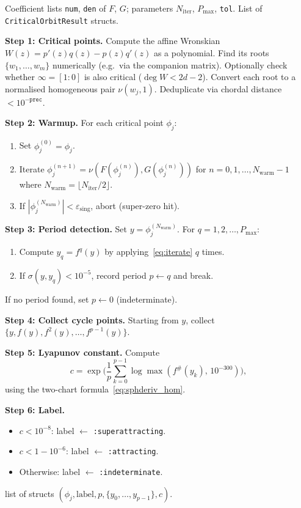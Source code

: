 \documentclass[12pt]{article}
\theoremstyle{definition}
\newcommand{\fsh}{f^{\#}}
\newcommand{\hpair}{[F:G]}
\begin{document}
\begin{algorithm}[h]
\caption{Critical orbit analysis for $f=\hpair$ of degree $d$}
\label{alg:critical}
\begin{algorithmic}[1]
\Require Coefficient lists \texttt{num}, \texttt{den} of $F$, $G$;
         parameters $N_{\mathrm{iter}}$, $P_{\max}$, \texttt{tol}.
\Ensure List of \texttt{CriticalOrbitResult} structs.

\State \textbf{Step 1: Critical points.}
  Compute the affine Wronskian $W(z)=p'(z)q(z)-p(z)q'(z)$ as a
  polynomial.  Find its roots $\{w_1,\ldots,w_m\}$ numerically
  (e.g.\ via the companion matrix).  Optionally check whether
  $\infty=[1:0]$ is also critical ($\deg W<2d-2$).
  Convert each root to a normalised homogeneous pair
  $\nu(w_j,1)$.  Deduplicate via chordal distance $<10^{-\texttt{prec}}$.

\State \textbf{Step 2: Warmup.}
  For each critical point $\phi_j$:
  \begin{enumerate}[label=\alph*.]
    \item Set $\phi_j^{(0)}=\phi_j$.
    \item Iterate $\phi_j^{(n+1)}=\nu(F(\phi_j^{(n)}),G(\phi_j^{(n)}))$
          for $n=0,1,\ldots,N_{\mathrm{warm}}-1$
          where $N_{\mathrm{warm}}=\lfloor N_{\mathrm{iter}}/2\rfloor$.
    \item If $|\phi_j^{(N_{\mathrm{warm}})}|<\varepsilon_{\mathrm{sing}}$,
          abort (super-zero hit).
  \end{enumerate}

\State \textbf{Step 3: Period detection.}
  Set $y=\phi_j^{(N_{\mathrm{warm}})}$.  For $q=1,2,\ldots,P_{\max}$:
  \begin{enumerate}[label=\alph*.]
    \item Compute $y_q = f^q(y)$ by applying~\eqref{eq:iterate} $q$ times.
    \item If $\sigma(y, y_q)<10^{-5}$, record period $p\leftarrow q$ and
          break.
  \end{enumerate}
  If no period found, set $p\leftarrow 0$ (indeterminate).

\State \textbf{Step 4: Collect cycle points.}
  Starting from $y$, collect $\{y, f(y), f^2(y), \ldots, f^{p-1}(y)\}$.

\State \textbf{Step 5: Lyapunov constant.}
  Compute
  \[
    c = \exp\!\biggl(\frac{1}{p}\sum_{k=0}^{p-1}
                     \log\max(\fsh(y_k),\,10^{-300})\biggr),
  \]
  using the two-chart formula~\eqref{eq:sphderiv_hom}.

\State \textbf{Step 6: Label.}
  \begin{itemize}[noitemsep]
    \item $c<10^{-8}$: label $\leftarrow$ \texttt{:superattracting}.
    \item $c<1-10^{-6}$: label $\leftarrow$ \texttt{:attracting}.
    \item Otherwise: label $\leftarrow$ \texttt{:indeterminate}.
  \end{itemize}

\State \Return list of structs
  $(\phi_j, \mathrm{label}, p, \{y_0,\ldots,y_{p-1}\}, c)$.
\end{algorithmic}
\end{algorithm}
\end{document}
